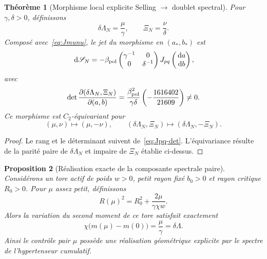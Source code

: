 \documentclass[11pt,a4paper]{article}
\newtheorem{theorem}{Théorème}[section]
\newtheorem{proposition}[theorem]{Proposition}
\newcommand{\dd}{\,\mathrm d}
\begin{document}
\begin{theorem}[Morphisme local explicite Selling $\to$ doublet spectral]\label{thm:selling-to-enriched-spectrum}
Pour $\gamma,\delta>0$, définissons
\begin{equation}\label{eq:spectral-control-map}
 \boxed{
 \delta\Lambda_N=\frac{\mu}{\gamma},
 \qquad
 \Xi_N=\frac{\nu}{\delta}.}
\end{equation}
Composé avec~\eqref{eq:Jmunu}, le jet du morphisme en $(a_*,b_*)$ est
\begin{equation}\label{eq:J-selling-spectrum}
 \dd\mathscr S_N
 =-\beta_{\rm pol}
 \begin{pmatrix}
  \gamma^{-1}&0\\0&\delta^{-1}
 \end{pmatrix}
 J_{pq}
 \begin{pmatrix}\dd a\\\dd b\end{pmatrix},
\end{equation}
avec
\begin{equation}\label{eq:J-selling-spectrum-det}
 \det\frac{\partial(\delta\Lambda_N,\Xi_N)}{\partial(a,b)}
 =\frac{\beta_{\rm pol}^2}{\gamma\delta}
 \left(-\frac{1616402}{21609}\right)\neq0.
\end{equation}
Ce morphisme est $C_2$-équivariant pour
\[
 (\mu,\nu)\mapsto(\mu,-\nu),
 \qquad
 (\delta\Lambda_N,\Xi_N)\mapsto(\delta\Lambda_N,-\Xi_N).
\]
\end{theorem}

\begin{proof}
Le rang et le déterminant suivent de~\eqref{eq:Jpq-det}. L'équivariance résulte de la parité paire de $\delta\Lambda_N$ et impaire de $\Xi_N$ établie ci-dessus.
\end{proof}

\begin{proposition}[Réalisation exacte de la composante spectrale paire]\label{prop:active-shell-realization}
Considérons un tore actif de poids $w>0$, petit rayon fixé $b_0>0$ et rayon critique $R_0>0$. Pour $\mu$ assez petit, définissons
\begin{equation}\label{eq:Rmu-active}
 R(\mu)^2=R_0^2+\frac{2\mu}{\gamma\chi w}.
\end{equation}
Alors la variation du second moment de ce tore satisfait exactement
\begin{equation}\label{eq:mu-spectral-exact}
 \boxed{\chi\bigl(m(\mu)-m(0)\bigr)=\frac{\mu}{\gamma}=\delta\Lambda.}
\end{equation}
Ainsi le contrôle pair $\mu$ possède une réalisation géométrique explicite par le spectre de l'hypertenseur cumulatif.
\end{proposition}
\end{document}
